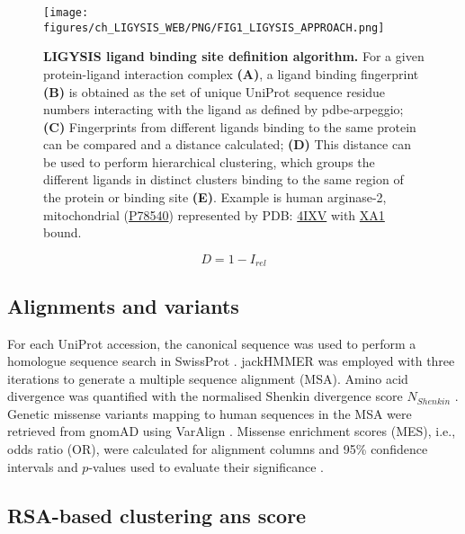 \begin{figure}[htb!]
    \centering
    \texttt{[image: figures/ch\_LIGYSIS\_WEB/PNG/FIG1\_LIGYSIS\_APPROACH.png]}
    \caption[LIGYSIS ligand binding site definition algorithm]{\textbf{LIGYSIS ligand binding site definition algorithm.} For a given protein-ligand interaction complex \textbf{(A)}, a ligand binding fingerprint \textbf{(B)} is obtained as the set of unique UniProt sequence residue numbers interacting with the ligand as defined by pdbe-arpeggio; \textbf{(C)} Fingerprints from different ligands binding to the same protein can be compared and a distance calculated; \textbf{(D)} This distance can be used to perform hierarchical clustering, which groups the different ligands in distinct clusters binding to the same region of the protein or binding site \textbf{(E)}. Example is human arginase-2, mitochondrial (\href{https://www.uniprot.org/uniprotkb/P78540/entry}{P78540}) represented by PDB: \href{https://www.ebi.ac.uk/pdbe/entry/pdb/4ixv}{4IXV} \cite{GOLEBIOWSKI_2013_ARGINASE} with \href{https://www.ebi.ac.uk/pdbe-srv/pdbechem/chemicalCompound/show/XA1}{XA1} bound.}
    \label{fig:LIGYSIS_method}
\end{figure}

\begin{equation}
D = 1 - I_{rel}
\label{eq:Irel_distance}
\end{equation}

\subsection{Alignments and variants}

For each UniProt accession, the canonical sequence was used to perform a homologue sequence search in SwissProt \cite{BOUTET_2016_UNIPROT}. jackHMMER \cite{EDDY_1995_HMMER} was employed with three iterations to generate a multiple sequence alignment (MSA). Amino acid divergence was quantified with the normalised Shenkin divergence score \cite{SHENKIN_1991_SCORE} $N_{Shenkin}$ \cite{UTGES_2021_ANKS}. Genetic missense variants mapping to human sequences in the MSA were retrieved from gnomAD \cite{KARCZEWSKI_2020_GNOMAD} using VarAlign \cite{MACGOWAN_2017_VARIANTS}. Missense enrichment scores (MES), i.e., odds ratio (OR), were calculated for alignment columns \cite{MACGOWAN_2024_VARIANTS} and 95\% confidence intervals and $p$-values used to evaluate their significance \cite{SZUMILAS_2010_ODDSRATIOS}.

\subsection{RSA-based clustering ans score}

